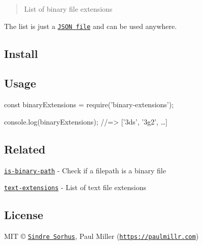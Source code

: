 \begin{quote}
List of binary file extensions \end{quote}


The list is just a \href{binary-extensions.json}{\tt J\+S\+ON file} and can be used anywhere.

\subsection*{Install}




\subsection*{Usage}


\begin{DoxyCode}
const binaryExtensions = require('binary-extensions');

console.log(binaryExtensions);
//=> ['3ds', '3g2', …]
\end{DoxyCode}


\subsection*{Related}


\begin{DoxyItemize}
\item \href{https://github.com/sindresorhus/is-binary-path}{\tt is-\/binary-\/path} -\/ Check if a filepath is a binary file
\item \href{https://github.com/sindresorhus/text-extensions}{\tt text-\/extensions} -\/ List of text file extensions
\end{DoxyItemize}

\subsection*{License}

M\+IT © \href{https://sindresorhus.com}{\tt Sindre Sorhus}, Paul Miller (\href{https://paulmillr.com}{\tt https\+://paulmillr.\+com}) 